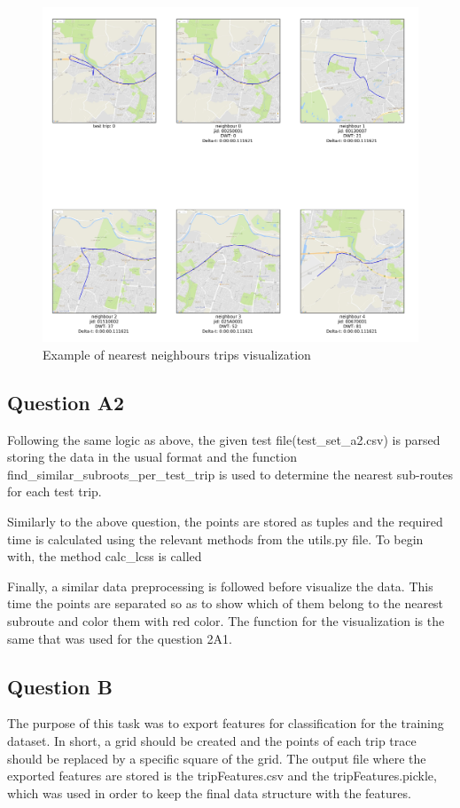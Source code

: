 \documentclass[12pt]{article}
\begin{document}
	\begin{figure} [H]
		\begin{center}
			\includegraphics [scale = 0.50] {question2a1example.jpg}
			\caption{Example of nearest neighbours trips visualization}
		\end{center}
	\end{figure} 
	
	\subsection{Question A2}
	Following the same logic as above, the given test file(test\_set\_a2.csv) is parsed storing the data in the usual format and the function find\_similar\_subroots\_per\_test\_trip is used to determine the nearest sub-routes for each test trip.
	
	Similarly to the above question, the points are stored as tuples and the required time is calculated using the relevant methods from the utils.py file. To begin with, the method calc\_lcss is called
	
	Finally, a similar data preprocessing is followed before visualize the data. This time the points are separated so as to show which of them belong to the nearest subroute and color them with red color. The function for the visualization is the same that was used for the question 2A1.
	
	\subsection{Question B}
	The purpose of this task was to export features for classification for the training dataset. In short, a grid should be created and the points of each trip trace should be replaced by a specific square of the grid. The output file where the exported features are stored is the tripFeatures.csv and the tripFeatures.pickle, which was used in order to keep the final data structure with the features.
	
\end{document}
